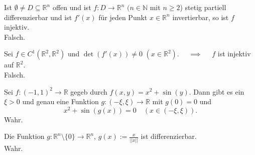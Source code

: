 Ist $\emptyset \neq D \subseteq \mathbb{R}^n$ offen und ist $f : D \to \mathbb{R}^n$ $(n \in \mathbb{N}$ mit $n \geq 2$) stetig partiell differenzierbar und ist $f'(x)$ für jeden Punkt $x \in \mathbb{R}^n$ invertierbar, so ist $f$ injektiv.\\
Falsch.

Sei $f \in C^1(\mathbb{R}^2, \mathbb{R}^2)$ und $\det(f'(x)) \neq 0$ $(x \in \mathbb{R}^2)$. $\quad \implies \quad$ $f$ ist injektiv auf $\mathbb{R}^2$.\\
Falsch.

Sei $f : (-1,1)^2 \to \mathbb{R}$ gegeb durch $f(x,y) = x^2 + \sin(y)$.
Dann gibt es ein $\xi > 0$ und genau eine Funktion $g : (-\xi, \xi) \to \mathbb{R}$ mit $g(0) = 0$ und
\begin{displaymath}
  x^2 + \sin(g(x)) = 0 \quad (x \in (-\xi, \xi)).
\end{displaymath}
Wahr.

Die Funktion $g : \mathbb{R}^n \setminus \{0\} \to \mathbb{R}^n$, $g(x) := \frac{x}{||x||}$ ist differenzierbar.\\
Wahr.